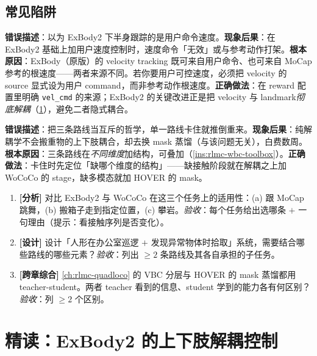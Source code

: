 \subsection{常见陷阱}
\begin{pitfall}
\textbf{错误描述}：以为 ExBody2 下半身跟踪的是用户命令速度。\textbf{现象后果}：在 ExBody2 基础上加用户速度控制时，速度命令「无效」或与参考动作打架。\textbf{根本原因}：ExBody（原版）的 velocity tracking 既可来自用户命令、也可来自 MoCap 参考的根速度——两者来源不同。若你要用户可控速度，必须把 velocity 的 source 显式设为用户 command，而非参考动作根速度。\textbf{正确做法}：在 reward 配置里明确 \verb|vel_cmd| 的来源；ExBody2 的关键改进正是把 velocity 与 landmark\emph{彻底解耦}（\cref{sec:rlmc-wbc-exbody}），避免二者隐式耦合。
\end{pitfall}
\begin{pitfall}[以为「选了一条路线就不能用另一条」]
\textbf{错误描述}：把三条路线当互斥的哲学，单一路线卡住就推倒重来。\textbf{现象后果}：纯解耦学不会搬重物的上下肢耦合，却去换 mask 蒸馏（与该问题无关），白费数周。\textbf{根本原因}：三条路线在\emph{不同维度}加结构，可叠加（\cref{ins:rlmc-wbc-toolbox}）。\textbf{正确做法}：卡住时先定位「缺哪个维度的结构」——缺接触阶段就在解耦之上加 WoCoCo 的 stage，缺多模态就加 HOVER 的 mask。
\end{pitfall}

\begin{practice}[本节动手]
\begin{enumerate}
  \item \textbf{[分析]} 对比 ExBody2 与 WoCoCo 在这三个任务上的适用性：(a) 跟 MoCap 跳舞，(b) 搬箱子走到指定位置，(c) 攀岩。\emph{验收}：每个任务给出选哪条 $+$ 一句理由（提示：看接触序列是否变化）。
  \item \textbf{[设计]} 设计「人形在办公室巡逻 $+$ 发现异常物体时拾取」系统，需要结合哪些路线的哪些元素？\emph{验收}：列出 $\geq 2$ 条路线及其各自承担的子任务。
  \item \textbf{[跨章综合]} \cref{ch:rlmc-quadloco} 的 VBC 分层与 HOVER 的 mask 蒸馏都用 teacher-student。两者 teacher 看到的信息、student 学到的能力各有何区别？\emph{验收}：列 $\geq 2$ 个区别。
\end{enumerate}
\end{practice}

\section{精读：ExBody2 的上下肢解耦控制}\label{sec:rlmc-wbc-exbody}

